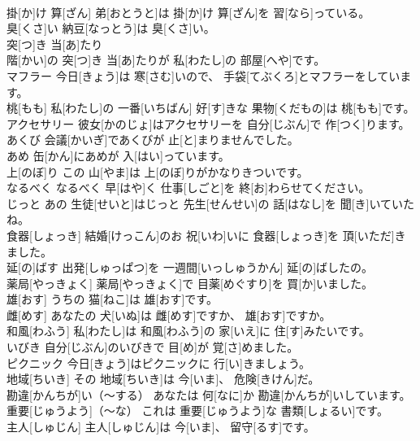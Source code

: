 \documentclass[8pt]{extreport}
\begin{document}
\begin{CJK}{UTF8}{min}
\\	掛[か]け 算[ざん]	弟[おとうと]は 掛[か]け 算[ざん]を 習[なら]っている。		
\\	臭[くさ]い	納豆[なっとう]は 臭[くさ]い。		
\\	突[つ]き 当[あ]たり	
\\	階[かい]の 突[つ]き 当[あ]たりが 私[わたし]の 部屋[へや]です。		
\\	マフラー	今日[きょう]は 寒[さむ]いので、 手袋[てぶくろ]とマフラーをしています。		
\\	桃[もも]	私[わたし]の 一番[いちばん] 好[す]きな 果物[くだもの]は 桃[もも]です。		
\\	アクセサリー	彼女[かのじょ]はアクセサリーを 自分[じぶん]で 作[つく]ります。		
\\	あくび	会議[かいぎ]であくびが 止[と]まりませんでした。		
\\	あめ	缶[かん]にあめが 入[はい]っています。		
\\	上[のぼ]り	この 山[やま]は 上[のぼ]りがかなりきついです。		
\\	なるべく	なるべく 早[はや]く 仕事[しごと]を 終[お]わらせてください。		
\\	じっと	あの 生徒[せいと]はじっと 先生[せんせい]の 話[はなし]を 聞[き]いていたね。		
\\	食器[しょっき]	結婚[けっこん]のお 祝[いわ]いに 食器[しょっき]を 頂[いただ]きました。		
\\	延[の]ばす	出発[しゅっぱつ]を 一週間[いっしゅうかん] 延[の]ばしたの。		
\\	薬局[やっきょく]	薬局[やっきょく]で 目薬[めぐすり]を 買[か]いました。		
\\	雄[おす]	うちの 猫[ねこ]は 雄[おす]です。		
\\	雌[めす]	あなたの 犬[いぬ]は 雌[めす]ですか、 雄[おす]ですか。		
\\	和風[わふう]	私[わたし]は 和風[わふう]の 家[いえ]に 住[す]みたいです。		
\\	いびき	自分[じぶん]のいびきで 目[め]が 覚[さ]めました。		
\\	ピクニック	今日[きょう]はピクニックに 行[い]きましょう。		
\\	地域[ちいき]	その 地域[ちいき]は 今[いま]、 危険[きけん]だ。		
\\	勘違[かんちが]い（～する）	あなたは 何[なに]か 勘違[かんちが]いしています。		
\\	重要[じゅうよう]（～な）	これは 重要[じゅうよう]な 書類[しょるい]です。		
\\	主人[しゅじん]	主人[しゅじん]は 今[いま]、 留守[るす]です。		

\end{CJK}
\end{document}

